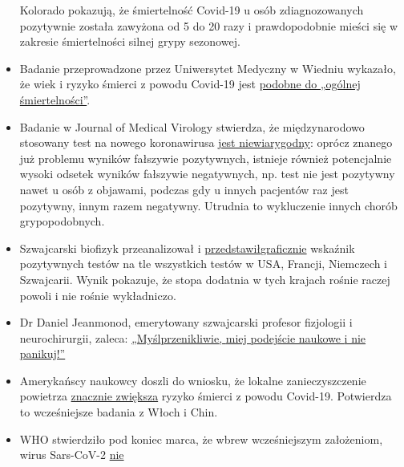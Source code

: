 \begin{itemize}
  Kolorado pokazują, że śmiertelność Covid-19 u osób zdiagnozowanych
  pozytywnie została zawyżona od 5 do 20 razy i prawdopodobnie mieści
  się w zakresie śmiertelności silnej grypy sezonowej.
\item
  Badanie przeprowadzone przez Uniwersytet Medyczny w Wiedniu wykazało,
  że wiek i ryzyko śmierci z powodu Covid-19 jest
  \href{https://www.vienna.at/analyse-zeigt-covid-19-opferkurve-entspricht-normaler-mortalitaet/6581246}{podobne
  do „ogólnej śmiertelności''}.
\item
  Badanie w Journal of Medical Virology stwierdza, że międzynarodowo
  stosowany test na nowego koronawirusa
  \href{https://www.ncbi.nlm.nih.gov/pubmed/32219885}{jest
  niewiarygodny}: oprócz znanego już problemu wyników fałszywie
  pozytywnych, istnieje również potencjalnie wysoki odsetek wyników
  fałszywie negatywnych, np. test nie jest pozytywny nawet u osób z
  objawami, podczas gdy u innych pacjentów raz jest pozytywny, innym
  razem negatywny. Utrudnia to wykluczenie innych chorób grypopodobnych.
\item
  Szwajcarski biofizyk przeanalizował i
  \href{https://swprs.org/rate-of-positive-covid19-tests/}{przedstawił}\href{https://swprs.org/rate-of-positive-covid19-tests/}{graficznie}
  wskaźnik pozytywnych testów na tle wszystkich testów w USA, Francji,
  Niemczech i Szwajcarii. Wynik pokazuje, że stopa dodatnia w tych
  krajach rośnie raczej powoli i nie rośnie wykładniczo.
\item
  Dr Daniel Jeanmonod, emerytowany szwajcarski profesor fizjologii i
  neurochirurgii, zaleca:
  \href{https://off-guardian.org/2020/04/07/think-deep-do-good-science-and-do-not-panic/}{„Myśl}\href{https://off-guardian.org/2020/04/07/think-deep-do-good-science-and-do-not-panic/}{przenikliwie}\href{https://off-guardian.org/2020/04/07/think-deep-do-good-science-and-do-not-panic/}{,
  }\href{https://off-guardian.org/2020/04/07/think-deep-do-good-science-and-do-not-panic/}{miej
  podejście naukowe
  }\href{https://off-guardian.org/2020/04/07/think-deep-do-good-science-and-do-not-panic/}{i
  nie panikuj!''}
\item
  Amerykańscy naukowcy doszli do wniosku, że lokalne zanieczyszczenie
  powietrza
  \href{https://www.medrxiv.org/content/10.1101/2020.04.05.20054502v1}{znacznie
  zwiększa} ryzyko śmierci z powodu Covid-19. Potwierdza to wcześniejsze
  badania z Włoch i Chin.
\item
  WHO stwierdziło pod koniec marca, że wbrew wcześniejszym założeniom,
  wirus Sars-CoV-2
  \href{https://www.who.int/news-room/commentaries/detail/modes-of-transmission-of-virus-causing-covid-19-implications-for-ipc-precaution-recommendations}{nie
}
\end{itemize}
